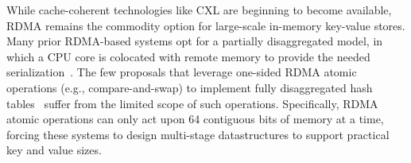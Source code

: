 While cache-coherent technologies like CXL are beginning to
become available, RDMA remains the commodity option for
large-scale in-memory key-value stores.
%
Many prior RDMA-based systems opt for a partially
disaggregated model, in which a CPU core is colocated with
remote memory to provide the needed
serialization~\cite{erpc,herd,pilaf,cell,clover}.
%
%
The few proposals that leverage one-sided RDMA atomic
operations (e.g., compare-and-swap) to implement fully
disaggregated hash tables~\cite{rolex,fusee,sherman, race}
suffer from the limited scope of such operations.
Specifically, RDMA atomic operations can only act upon 64
contiguous bits of memory at a time, forcing these systems
to design multi-stage datastructures to support practical
key and value sizes.

